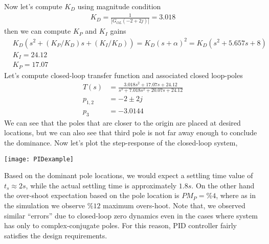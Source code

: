 \documentclass[twoside]{article}
\begin{document}
%
Now let's compute $K_D$ using magnitude condition
%
\begin{align*}
  K_D = \frac{1}{| G_{OL}(-2 + 2 j) |} = 3.018
\end{align*}
%
then we can compute $K_P$ and $K_I$ gains 
\begin{align*}
& K_D \left( s^2 +   (K_P/K_D) s  + (K_I/K_D)  \right)
= K_D (s+\alpha)^2 = K_D ( s^2 + 5.657 s + 8)
\\
& K_I = 24.12
\\
& K_P = 17.07
\end{align*}
%
Let's compute closed-loop transfer function and associated
closed loop-poles
%
\begin{align*}
  T(s) &= \frac{ 3.018 s^2 + 17.07 s + 24.12 }{ s^3 + 7.018 s^2 + 20.07
  s + 24.12  }
  \\
  p_{1,2} &= -2 \pm 2 j
\\
p_{3} &= -3.0144
\end{align*}
%
We can see that the poles that are closer to the origin are placed at 
desired locations, but we can also see that third pole is not
far away enough to conclude the dominance. Now let's plot the
step-response of the closed-loop system,

\vspace{6 pt}

  \begin{minipage}[h]{1\linewidth}
    \begin{center}
      \texttt{[image: PIDexample]}
    \end{center}
  \end{minipage}

\vspace{6 pt}

Based on the dominant pole locations, we would expect a settling
time value of $t_{s} \approx 2 s$, while the actual settling time is 
approximately $1.8 s$. On the other hand the over-shoot expectation
based on the pole location is $PM_P = \%4$, where as in the simulation
we observe $\%12$ maximum overs-hoot. Note that, we observed similar
``errors'' due to closed-loop zero dynamics even in the cases where 
system has only to complex-conjugate poles. For this reason, PID
controller fairly satisfies the design requirements. 


\end{document}
